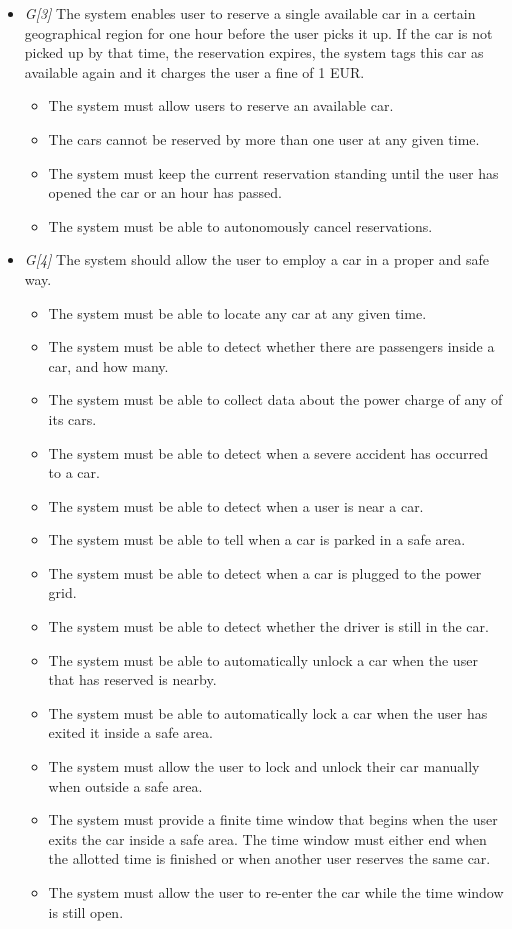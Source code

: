 \begin{itemize}
				\item \textit{G[3]} The system enables user to reserve a single available car in a certain geographical region for one hour before the user picks it up. If the car is not picked up by that time, the reservation expires, the system tags this car as available again and it charges the user a fine of 1 EUR.
					\begin{itemize}
						\item The system must allow users to reserve an available car.
						\item The cars cannot be reserved by more than one user at any given time.
						\item The system must keep the current reservation standing until the user has opened the car or an hour has passed. %
						\item The system must be able to autonomously cancel reservations.
					\end{itemize}

				\item \textit{G[4]} The system should allow the user to employ a car in a proper and safe way. 
					\begin{itemize}
						\item The system must be able to locate any car at any given time. 
						\item The system must be able to detect whether there are passengers inside a car, and how many.
						\item The system must be able to collect data about the power charge of any of its cars.
						\item The system must be able to detect when a severe accident has occurred to a car.
						\item The system must be able to detect when a user is near a car.
						\item The system must be able to tell when a car is parked in a safe area.
						\item The system must be able to detect when a car is plugged to the power grid.
						\item The system must be able to detect whether the driver is still in the car.
						\item The system must be able to automatically unlock a car when the user that has reserved is nearby. %
						\item The system must be able to automatically lock a car when the user has exited it inside a safe area. 
						\item The system must allow the user to lock and unlock their car manually when outside a safe area.
						\item The system must provide a finite time window that begins when the user exits the car inside a safe area. The time window must either end when the allotted time is finished or when another user reserves the same car.
						\item The system must allow the user to re-enter the car while the time window is still open. 
					\end{itemize}
					

\end{itemize}

